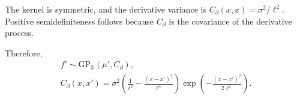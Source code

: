 \documentclass[11pt,letterpaper]{article}
\begin{document}

The kernel is symmetric, and the derivative variance is
$C_{\partial}(x,x)=\sigma^2/\ell^2$.
Positive semidefiniteness follows because $C_{\partial}$ is the covariance
of the derivative process.

Therefore,
\[
  \boxed{
    \begin{gathered}
      f'\sim\mathrm{GP}_{\mathbb R}(\mu',C_{\partial}),\\
      C_{\partial}(x,x')=
      \sigma^2\left(\frac1{\ell^2}-\frac{(x-x')^2}{\ell^4}\right)
      \exp\!\left(-\frac{(x-x')^2}{2\ell^2}\right).
    \end{gathered}
  }
\]
\end{document}
